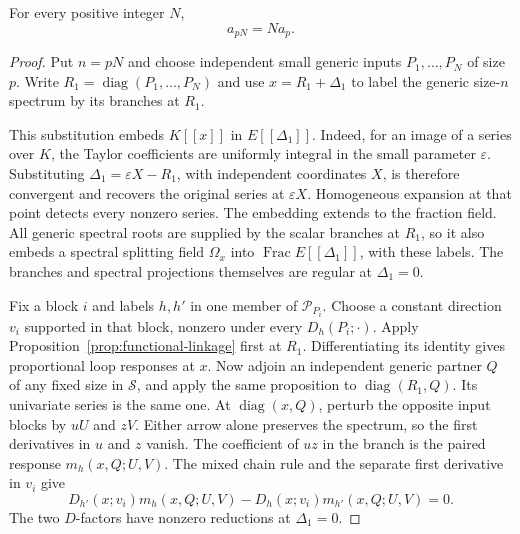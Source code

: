 \begin{proposition}
\label{prop:active-replication}
For every positive integer $N$,
\[
 a_{pN}=N a_p.
\]
\end{proposition}

\begin{proof}
Put $n=pN$ and choose independent small generic inputs
$P_1,\ldots,P_N$ of size $p$.  Write
$R_1=\operatorname{diag}(P_1,\ldots,P_N)$ and use
$x=R_1+\Delta_1$ to label the generic size-$n$ spectrum by its branches
at $R_1$.

This substitution embeds $K[[x]]$ in $E[[\Delta_1]]$.  Indeed, for
an image of a series over $K$, the Taylor coefficients are uniformly
integral in the small parameter $\varepsilon$.  Substituting
$\Delta_1=\varepsilon X-R_1$, with independent coordinates $X$,
is therefore convergent and recovers the original series at
$\varepsilon X$.  Homogeneous expansion at that point detects every
nonzero series.  The embedding extends to the fraction field.  All
generic spectral roots are supplied by the scalar branches at $R_1$,
so it also embeds a spectral splitting field $\Omega_x$ into
$\operatorname{Frac}E[[\Delta_1]]$, with these labels.  The branches
and spectral projections themselves are regular at $\Delta_1=0$.

Fix a block $i$ and labels $h,h'$ in one member of
$\mathcal P_{P_i}$.  Choose a constant direction $v_i$ supported in
that block, nonzero under every $D_h(P_i;\cdot)$.  Apply
Proposition~\ref{prop:functional-linkage} first at $R_1$.
Differentiating its identity gives proportional loop responses at
$x$.  Now adjoin an independent generic partner $Q$ of any fixed
size in $\mathcal S$, and apply the same proposition to
$\operatorname{diag}(R_1,Q)$.  Its univariate series is the same
one.  At $\operatorname{diag}(x,Q)$, perturb the opposite input
blocks by $uU$ and $zV$.  Either arrow alone preserves the spectrum,
so the first derivatives in $u$ and $z$ vanish.  The coefficient of
$uz$ in the branch is the paired response $m_h(x,Q;U,V)$.
The mixed chain rule and the separate first derivative in $v_i$
give
\begin{equation}
 D_{h'}(x;v_i)m_h(x,Q;U,V)
   -D_h(x;v_i)m_{h'}(x,Q;U,V)=0.
 \label{eq:replicated-pair-relation}
\end{equation}
The two $D$-factors have nonzero reductions at $\Delta_1=0$.


\end{proof}
